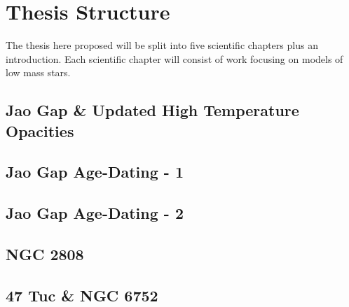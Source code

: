 \section{Thesis Structure}\label{sec:thesis} The thesis here proposed will be
split into five scientific chapters plus an introduction. Each scientific
chapter will consist of work focusing on models of low mass stars.

\subsection{Jao Gap \& Updated High Temperature Opacities}\label{sec:p1}


\subsection{Jao Gap Age-Dating - 1}\label{sec:p2}


\subsection{Jao Gap Age-Dating - 2}\label{sec:p3}


\subsection{NGC 2808}\label{sec:p4}


\subsection{47 Tuc \& NGC 6752}\label{sec:p5}

